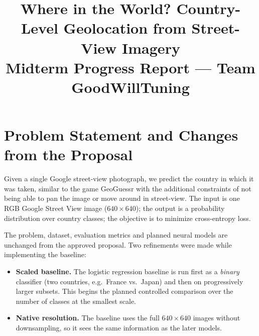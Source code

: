 \documentclass[conference]{IEEEtran}
\begin{document}
\title{Where in the World? Country-Level Geolocation from Street-View Imagery\\
{\large Midterm Progress Report --- Team GoodWillTuning}}

\author{
\and
{}
\and
{}
}

\maketitle

\section{Problem Statement and Changes from the Proposal}

Given a single Google street-view photograph, we predict the country in which it was taken, similar to the game GeoGuessr with the additional constraints of not being able to pan the image or move around in street-view. The input is one RGB Google Street View
image ($640\times640$); the output is a probability distribution over country
classes; the objective is to minimize cross-entropy loss.

The problem, dataset, evaluation metrics and planned neural models are
unchanged from the approved proposal. Two refinements were made while
implementing the baseline:
\begin{itemize}
  \item \textbf{Scaled baseline.} The logistic regression baseline is run first
  as a \emph{binary} classifier (two countries, e.g.\ France vs.\ Japan) and
  then on progressively larger subsets. This begins the planned controlled
  comparison over the number of classes at the smallest scale.
  \item \textbf{Native resolution.} The baseline uses the full $640\times640$
  images without downsampling, so it sees the same information as the later
  models.
\end{itemize}
\end{document}
